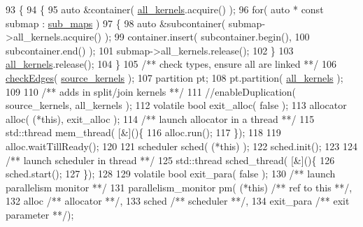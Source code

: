 \begin{DoxyCode}
93    \{
94       \{
95          \textcolor{keyword}{auto} &container( \hyperlink{class_map_base_a2220cd630c5d00708f08d9bc70a48220}{all\_kernels}.acquire() );
96          \textcolor{keywordflow}{for}( \textcolor{keyword}{auto} * \textcolor{keyword}{const} submap : \hyperlink{class_map_base_abc4856ed552e77510211851f0a4a02ab}{sub\_maps} )
97          \{
98             \textcolor{keyword}{auto} &subcontainer( submap->all\_kernels.acquire() );  
99             container.insert( subcontainer.begin(),
100                               subcontainer.end()   );
101             submap->all\_kernels.release();
102          \}
103          \hyperlink{class_map_base_a2220cd630c5d00708f08d9bc70a48220}{all\_kernels}.release();
104       \}\textcolor{comment}{}
105 \textcolor{comment}{      /** check types, ensure all are linked **/}
106       \hyperlink{classraft_1_1map_aad8ce35fdb536b14db16b3462157dcd7}{checkEdges}( \hyperlink{class_map_base_a2541cb37a237e66fc88129f9f0b02f50}{source\_kernels} );
107       partition pt;
108       pt.partition( \hyperlink{class_map_base_a2220cd630c5d00708f08d9bc70a48220}{all\_kernels} );
109       \textcolor{comment}{}
110 \textcolor{comment}{      /** adds in split/join kernels **/}
111       \textcolor{comment}{//enableDuplication( source\_kernels, all\_kernels );}
112       \textcolor{keyword}{volatile} \textcolor{keywordtype}{bool} exit\_alloc( \textcolor{keyword}{false} );
113       allocator alloc( (*\textcolor{keyword}{this}), exit\_alloc );\textcolor{comment}{}
114 \textcolor{comment}{      /** launch allocator in a thread **/}
115       std::thread mem\_thread( [&]()\{
116          alloc.run();
117       \});
118      
119       alloc.waitTillReady();
120 
121       scheduler sched( (*\textcolor{keyword}{this}) );
122       sched.init();
123       \textcolor{comment}{}
124 \textcolor{comment}{      /** launch scheduler in thread **/}
125       std::thread sched\_thread( [&]()\{
126          sched.start();
127       \});
128 
129       \textcolor{keyword}{volatile} \textcolor{keywordtype}{bool} exit\_para( \textcolor{keyword}{false} );\textcolor{comment}{}
130 \textcolor{comment}{      /** launch parallelism monitor **/}
131       parallelism\_monitor pm( (*\textcolor{keyword}{this})     \textcolor{comment}{/** ref to this    **/}, 
132                               alloc       \textcolor{comment}{/** allocator      **/},
133                               sched       \textcolor{comment}{/** scheduler      **/},
134                               exit\_para   \textcolor{comment}{/** exit parameter **/});

\end{DoxyCode}
